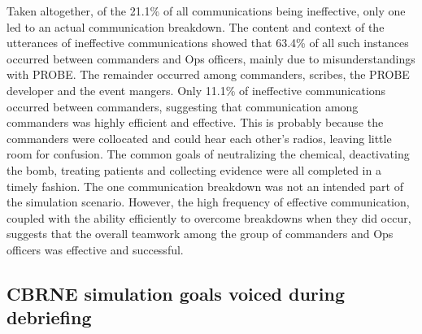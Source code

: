 \documentclass[link]{IWCOMP}
\begin{document}
Taken altogether, of the 21.1{\%} of all communications being ineffective,
only one led to an actual communication breakdown. The content and context
of the utterances of ineffective communications showed that 63.4{\%} of all
such instances occurred between commanders and Ops officers, mainly due to
misunderstandings with PROBE. The remainder occurred among commanders,
scribes, the PROBE developer and the event mangers. Only 11.1{\%} of
ineffective communications occurred between commanders, suggesting that
communication among commanders was highly efficient and effective. This is
probably because the commanders were collocated and could hear each other's
radios, leaving little room for confusion. The common goals of neutralizing
the chemical, deactivating the bomb, treating patients and collecting
evidence were all completed in a timely fashion. The one communication
breakdown was not an intended part of the simulation scenario. However, the
high frequency of effective communication, coupled with the ability
efficiently to overcome breakdowns when they did occur, suggests that the
overall teamwork among the group of commanders and Ops officers was
effective and successful.

\subsection{CBRNE simulation goals voiced during debriefing}\label{subsec4.6}
\end{document}
